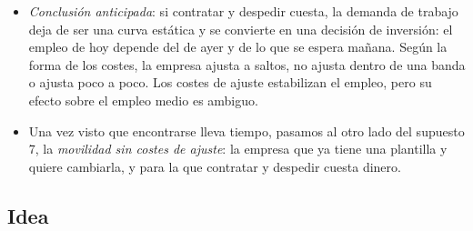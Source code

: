 \documentclass[11pt]{article}
\begin{document}
\begin{itemize}
\item \emph{Conclusión anticipada}: si contratar y despedir cuesta, la demanda de trabajo deja de ser una curva estática y se convierte en una decisión de inversión: el empleo de hoy depende del de ayer y de lo que se espera mañana. Según la forma de los costes, la empresa ajusta a saltos, no ajusta dentro de una banda o ajusta poco a poco. Los costes de ajuste estabilizan el empleo, pero su efecto sobre el empleo medio es ambiguo.
\item Una vez visto que encontrarse lleva tiempo, pasamos al otro lado del supuesto 7, la \emph{movilidad sin costes de ajuste}: la empresa que ya tiene una plantilla y quiere cambiarla, y para la que contratar y despedir cuesta dinero.
\end{itemize}

\subsection{Idea}\label{sec:ajuste-idea}
\end{document}

